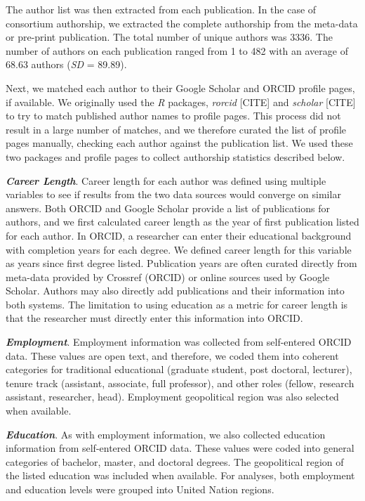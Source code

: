 \documentclass[
  man]{apa6}
\begin{document}
The author list was then extracted from each publication. In the case of consortium authorship, we extracted the complete authorship from the meta-data or pre-print publication. The total number of unique authors was 3336. The number of authors on each publication ranged from 1 to 482 with an average of 68.63 authors (\emph{SD} = 89.89).

Next, we matched each author to their Google Scholar and ORCID profile pages, if available. We originally used the \emph{R} packages, \emph{rorcid} {[}CITE{]} and \emph{scholar} {[}CITE{]} to try to match published author names to profile pages. This process did not result in a large number of matches, and we therefore curated the list of profile pages manually, checking each author against the publication list. We used these two packages and profile pages to collect authorship statistics described below.

\textbf{\emph{Career Length}}. Career length for each author was defined using multiple variables to see if results from the two data sources would converge on similar answers. Both ORCID and Google Scholar provide a list of publications for authors, and we first calculated career length as the year of first publication listed for each author. In ORCID, a researcher can enter their educational background with completion years for each degree. We defined career length for this variable as years since first degree listed. Publication years are often curated directly from meta-data provided by Crossref (ORCID) or online sources used by Google Scholar. Authors may also directly add publications and their information into both systems. The limitation to using education as a metric for career length is that the researcher must directly enter this information into ORCID.

\textbf{\emph{Employment}}. Employment information was collected from self-entered ORCID data. These values are open text, and therefore, we coded them into coherent categories for traditional educational (graduate student, post doctoral, lecturer), tenure track (assistant, associate, full professor), and other roles (fellow, research assistant, researcher, head). Employment geopolitical region was also selected when available.

\textbf{\emph{Education}}. As with employment information, we also collected education information from self-entered ORCID data. These values were coded into general categories of bachelor, master, and doctoral degrees. The geopolitical region of the listed education was included when available. For analyses, both employment and education levels were grouped into United Nation regions.
\end{document}

